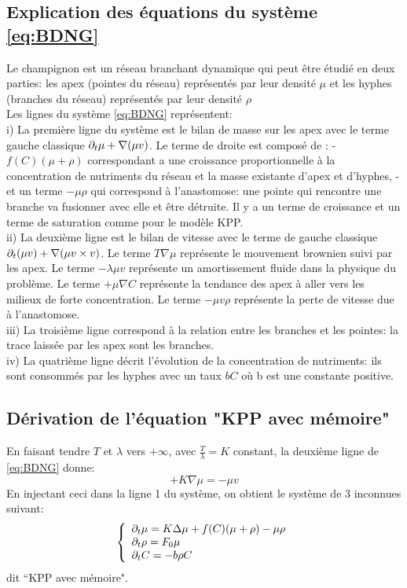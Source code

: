 \documentclass[11pt]{article}
\begin{document}
\subsection{Explication des équations du système \eqref{eq:BDNG}}
Le champignon est un réseau branchant dynamique qui peut être étudié en deux parties: les apex (pointes du réseau) représentés par leur densité $\mu$ et les hyphes (branches du réseau) représentés par leur densité $\rho$\\
Les lignes du système \eqref{eq:BDNG} représentent:\\
i) La première ligne du système est le bilan de masse sur les apex avec le terme gauche classique $ \partial_t\mu + \nabla(\mu v) $. Le terme de droite est composé de : - $f(C)(\mu + \rho)$ correspondant a une croissance proportionnelle à la concentration de nutriments du réseau et la masse existante d'apex et d'hyphes, - et un terme $-\mu\rho$ qui correspond à l'anastomose: une pointe qui rencontre une branche va fusionner avec elle et être détruite. Il y a un terme de croissance et un terme de saturation comme pour le modèle KPP.
\\ ii)  La deuxième ligne est le bilan de vitesse avec le terme de gauche classique $ \partial_t(\mu v)+\nabla(\mu v\times v) $. Le terme $T\nabla\mu$ représente le mouvement brownien suivi par les apex. Le terme $-\lambda\mu v$ représente un amortissement fluide dans la physique du problème. Le terme  $+\mu\nabla C$ représente la tendance des apex à aller vers les milieux de forte concentration. Le terme $-\mu v \rho $ représente la perte de vitesse due à l'anastomose.\\
iii) La troisième ligne correspond à la relation entre les branches et les pointes: la trace laissée par les apex sont les branches.\\
iv) La quatrième ligne décrit l'évolution de la concentration de nutriments: ils sont consommés par les hyphes avec un taux $bC$ où b est une constante positive.
\subsection{Dérivation de l'équation "KPP avec mémoire"}
En faisant tendre $T$ et $\lambda$ vers $+\infty$, avec $\frac{T}{\lambda}=K$ constant, la deuxième ligne de \eqref{eq:BDNG} donne: 
\begin{equation}
	+K\nabla\mu=-\mu v
\end{equation}
En injectant ceci dans la ligne 1 du système, on obtient le système de 3 inconnues suivant:
 \begin{equation} \left\{
                \begin{array}{ll}
                   \partial_t\mu = K\Delta\mu + f(C)(\mu + \rho) -\mu\rho\\
                 \partial_t\rho=  F_0 \mu \\
                  \partial_t C = -b\rho C
                \end{array}
              \right.
\end{equation}
dit ``KPP avec mémoire".
\ifdefined\COMPLETE
\else
\end{document}
